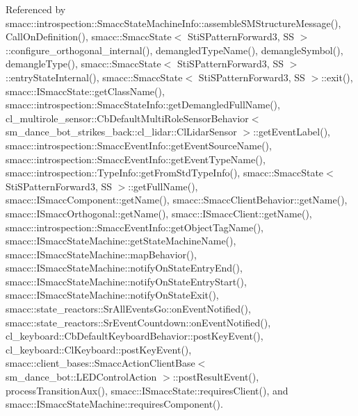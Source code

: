 Referenced by smacc\+::introspection\+::\+Smacc\+State\+Machine\+Info\+::assemble\+S\+M\+Structure\+Message(), Call\+On\+Definition(), smacc\+::\+Smacc\+State$<$ Sti\+S\+Pattern\+Forward3, S\+S $>$\+::configure\+\_\+orthogonal\+\_\+internal(), demangled\+Type\+Name(), demangle\+Symbol(), demangle\+Type(), smacc\+::\+Smacc\+State$<$ Sti\+S\+Pattern\+Forward3, S\+S $>$\+::entry\+State\+Internal(), smacc\+::\+Smacc\+State$<$ Sti\+S\+Pattern\+Forward3, S\+S $>$\+::exit(), smacc\+::\+I\+Smacc\+State\+::get\+Class\+Name(), smacc\+::introspection\+::\+Smacc\+State\+Info\+::get\+Demangled\+Full\+Name(), cl\+\_\+multirole\+\_\+sensor\+::\+Cb\+Default\+Multi\+Role\+Sensor\+Behavior$<$ sm\+\_\+dance\+\_\+bot\+\_\+strikes\+\_\+back\+::cl\+\_\+lidar\+::\+Cl\+Lidar\+Sensor $>$\+::get\+Event\+Label(), smacc\+::introspection\+::\+Smacc\+Event\+Info\+::get\+Event\+Source\+Name(), smacc\+::introspection\+::\+Smacc\+Event\+Info\+::get\+Event\+Type\+Name(), smacc\+::introspection\+::\+Type\+Info\+::get\+From\+Std\+Type\+Info(), smacc\+::\+Smacc\+State$<$ Sti\+S\+Pattern\+Forward3, S\+S $>$\+::get\+Full\+Name(), smacc\+::\+I\+Smacc\+Component\+::get\+Name(), smacc\+::\+Smacc\+Client\+Behavior\+::get\+Name(), smacc\+::\+I\+Smacc\+Orthogonal\+::get\+Name(), smacc\+::\+I\+Smacc\+Client\+::get\+Name(), smacc\+::introspection\+::\+Smacc\+Event\+Info\+::get\+Object\+Tag\+Name(), smacc\+::\+I\+Smacc\+State\+Machine\+::get\+State\+Machine\+Name(), smacc\+::\+I\+Smacc\+State\+Machine\+::map\+Behavior(), smacc\+::\+I\+Smacc\+State\+Machine\+::notify\+On\+State\+Entry\+End(), smacc\+::\+I\+Smacc\+State\+Machine\+::notify\+On\+State\+Entry\+Start(), smacc\+::\+I\+Smacc\+State\+Machine\+::notify\+On\+State\+Exit(), smacc\+::state\+\_\+reactors\+::\+Sr\+All\+Events\+Go\+::on\+Event\+Notified(), smacc\+::state\+\_\+reactors\+::\+Sr\+Event\+Countdown\+::on\+Event\+Notified(), cl\+\_\+keyboard\+::\+Cb\+Default\+Keyboard\+Behavior\+::post\+Key\+Event(), cl\+\_\+keyboard\+::\+Cl\+Keyboard\+::post\+Key\+Event(), smacc\+::client\+\_\+bases\+::\+Smacc\+Action\+Client\+Base$<$ sm\+\_\+dance\+\_\+bot\+::\+L\+E\+D\+Control\+Action $>$\+::post\+Result\+Event(), process\+Transition\+Aux(), smacc\+::\+I\+Smacc\+State\+::requires\+Client(), and smacc\+::\+I\+Smacc\+State\+Machine\+::requires\+Component().


